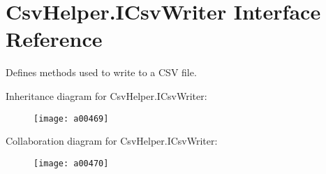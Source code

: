 \hypertarget{a00117}{\section{Csv\-Helper.\-I\-Csv\-Writer Interface Reference}
\label{a00117}
}


Defines methods used to write to a C\-S\-V file.  




Inheritance diagram for Csv\-Helper.\-I\-Csv\-Writer\-:
\nopagebreak
\begin{figure}[H]
\begin{center}
\leavevmode
\texttt{[image: a00469]}
\end{center}
\end{figure}


Collaboration diagram for Csv\-Helper.\-I\-Csv\-Writer\-:
\nopagebreak
\begin{figure}[H]
\begin{center}
\leavevmode
\texttt{[image: a00470]}
\end{center}
\end{figure}
